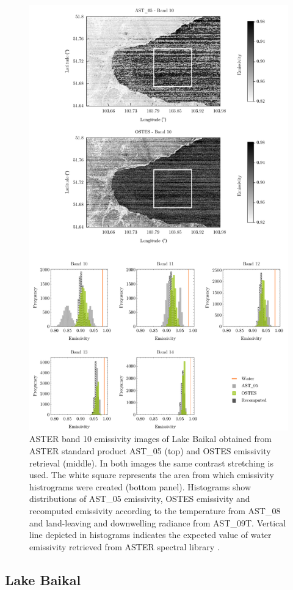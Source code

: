 \begin{figure}[!h]
\centering
\includegraphics[width=0.76\linewidth]{pics/Chapter_04/Baikal.pdf}
\vspace{1.5 em}
\caption{
ASTER band 10 emissivity images of Lake Baikal obtained from ASTER standard product AST\_05 (top) and OSTES emissivity retrieval (middle). In both images the same contrast stretching is used. The white square represents the area from which emissivity histrograms were created (bottom panel). Histograms show distributions of AST\_05 emissivity, OSTES emissivity and recomputed emissivity according to the temperature from AST\_08 and land-leaving and downwelling radiance from AST\_09T. Vertical line depicted in histograms indicates the expected value of water emissivity retrieved from ASTER spectral library \cite{BH09}.}
\label{fig:Bajkal}
\end{figure}

\subsection*{Lake Baikal}

